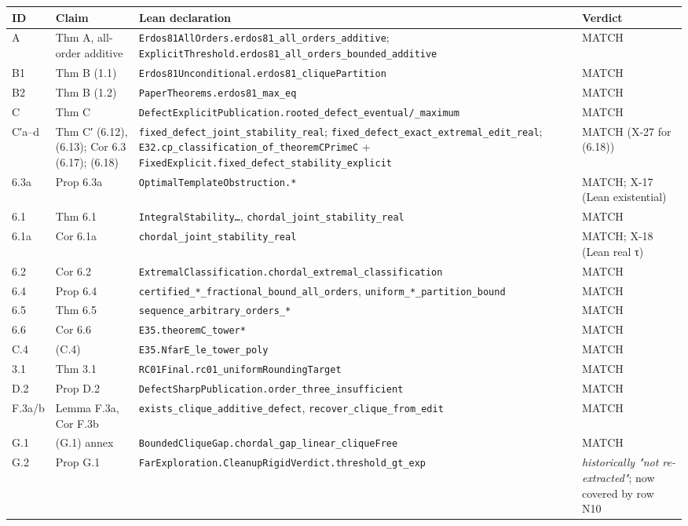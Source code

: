 \documentclass[
]{article}
\newcounter{none} %
\begin{document}
{\def\LTcaptype{none} %
\begin{longtable}[]{@{}llll@{}}
\toprule\noalign{}
ID & Claim & Lean declaration & Verdict \\
\midrule\noalign{}
\endhead
\bottomrule\noalign{}
\endlastfoot
A & Thm A, all-order additive &
\texttt{Erdos81AllOrders.erdos81\_all\_orders\_additive};
\texttt{ExplicitThreshold.erdos81\_all\_orders\_bounded\_additive} &
MATCH \\
B1 & Thm B (1.1) &
\texttt{Erdos81Unconditional.erdos81\_cliquePartition} & MATCH \\
B2 & Thm B (1.2) & \texttt{PaperTheorems.erdos81\_max\_eq} & MATCH \\
C & Thm C &
\texttt{DefectExplicitPublication.rooted\_defect\_eventual/\_maximum} &
MATCH \\
C′a--d & Thm C′ (6.12), (6.13); Cor 6.3 (6.17); (6.18) &
\texttt{fixed\_defect\_joint\_stability\_real};
\texttt{fixed\_defect\_exact\_extremal\_edit\_real};
\texttt{E32.cp\_classification\_of\_theoremCPrimeC} +
\texttt{FixedExplicit.fixed\_defect\_stability\_explicit} & MATCH (X-27
for (6.18)) \\
6.3a & Prop 6.3a & \texttt{OptimalTemplateObstruction.*} & MATCH; X-17
(Lean existential) \\
6.1 & Thm 6.1 & \texttt{IntegralStability…},
\texttt{chordal\_joint\_stability\_real} & MATCH \\
6.1a & Cor 6.1a & \texttt{chordal\_joint\_stability\_real} & MATCH; X-18
(Lean real τ) \\
6.2 & Cor 6.2 &
\texttt{ExtremalClassification.chordal\_extremal\_classification} &
MATCH \\
6.4 & Prop 6.4 & \texttt{certified\_*\_fractional\_bound\_all\_orders},
\texttt{uniform\_*\_partition\_bound} & MATCH \\
6.5 & Thm 6.5 & \texttt{sequence\_arbitrary\_orders\_*} & MATCH \\
6.6 & Cor 6.6 & \texttt{E35.theoremC\_tower*} & MATCH \\
C.4 & (C.4) & \texttt{E35.NfarE\_le\_tower\_poly} & MATCH \\
3.1 & Thm 3.1 & \texttt{RC01Final.rc01\_uniformRoundingTarget} &
MATCH \\
D.2 & Prop D.2 &
\texttt{DefectSharpPublication.order\_three\_insufficient} & MATCH \\
F.3a/b & Lemma F.3a, Cor F.3b &
\texttt{exists\_clique\_additive\_defect},
\texttt{recover\_clique\_from\_edit} & MATCH \\
G.1 & (G.1) annex &
\texttt{BoundedCliqueGap.chordal\_gap\_linear\_cliqueFree} & MATCH \\
G.2 & Prop G.1 &
\texttt{FarExploration.CleanupRigidVerdict.threshold\_gt\_exp} &
\emph{historically "not re-extracted"}; now covered by row N10 \\
\end{longtable}
}
\end{document}
